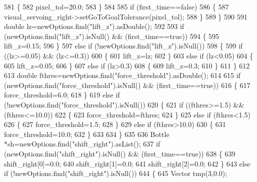 \begin{DoxyCode}
581         \{
582             pixel_tol=20.0;
583         \}
584 
585         \textcolor{keywordflow}{if} (first\_time==\textcolor{keyword}{false})
586         \{
587             visual_servoing_right->setGoToGoalTolerance(pixel_tol);
588         \}
589     \}
590 
591     \textcolor{keywordtype}{double} lz=newOptions.find(\textcolor{stringliteral}{"lift\_z"}).asDouble();
592 
593     \textcolor{keywordflow}{if} (newOptions.find(\textcolor{stringliteral}{"lift\_z"}).isNull() && (first\_time==\textcolor{keyword}{true}))
594     \{
595         lift_z=0.15;
596     \}
597     \textcolor{keywordflow}{else} \textcolor{keywordflow}{if} (!newOptions.find(\textcolor{stringliteral}{"lift\_z"}).isNull())
598     \{
599         \textcolor{keywordflow}{if} ((lz>=0.05) && (lz<=0.3))
600         \{
601             lift_z=lz;
602         \}
603         \textcolor{keywordflow}{else} \textcolor{keywordflow}{if} (lz<0.05)
604         \{
605             lift_z=0.05;
606         \}       
607         \textcolor{keywordflow}{else} \textcolor{keywordflow}{if} (lz>0.3)
608         \{
609             lift_z=0.3;
610         \}
611     \}
612 
613     \textcolor{keywordtype}{double} fthres=newOptions.find(\textcolor{stringliteral}{"force\_threshold"}).asDouble();
614 
615     \textcolor{keywordflow}{if} (newOptions.find(\textcolor{stringliteral}{"force\_threshold"}).isNull() && (first\_time==\textcolor{keyword}{true}))
616     \{
617         force_threshold=6.0;
618     \}
619     \textcolor{keywordflow}{else} \textcolor{keywordflow}{if} (!newOptions.find(\textcolor{stringliteral}{"force\_threshold"}).isNull())
620     \{
621         \textcolor{keywordflow}{if} ((fthres>=1.5) && (fthres<=10.0))
622         \{
623             force_threshold=fthres;
624         \}
625         \textcolor{keywordflow}{else} \textcolor{keywordflow}{if} (fthres<1.5)
626         \{
627             force_threshold=1.5;
628         \}
629         \textcolor{keywordflow}{else} \textcolor{keywordflow}{if} (fthres>10.0)
630         \{
631             force_threshold=10.0;
632         \}
633 
634     \}
635 
636     Bottle *sh=newOptions.find(\textcolor{stringliteral}{"shift\_right"}).asList();
637     \textcolor{keywordflow}{if} (newOptions.find(\textcolor{stringliteral}{"shift\_right"}).isNull() && (first\_time==\textcolor{keyword}{true}))
638     \{
639         shift_right[0]=0.0;
640         shift_right[1]=0.0;
641         shift_right[2]=0.0;
642     \}
643     \textcolor{keywordflow}{else} \textcolor{keywordflow}{if} (!newOptions.find(\textcolor{stringliteral}{"shift\_right"}).isNull())
644     \{
645         Vector tmp(3,0.0);

\end{DoxyCode}
